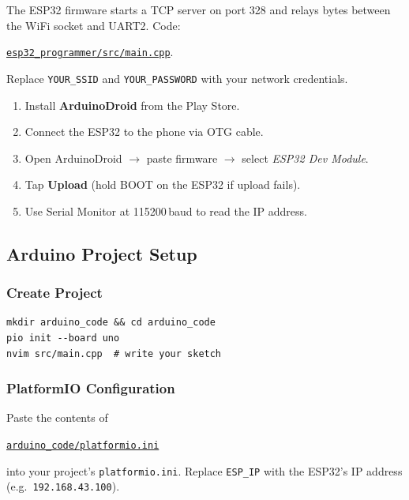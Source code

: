 \documentclass[11pt, a4paper]{article}
\begin{document}
The ESP32 firmware starts a TCP server on port 328 and relays bytes between the
WiFi socket and UART2. Code:
\begin{notebox}
\href{https://github.com/gajaredarsh/esp-flasher/blob/main/esp_programmer/src/main.cpp}%
{\texttt{esp32\_programmer/src/main.cpp}}.
\end{notebox}
Replace \texttt{YOUR\_SSID} and \texttt{YOUR\_PASSWORD} with your network credentials.

\begin{enumerate}
  \item Install \textbf{ArduinoDroid} from the Play Store.
  \item Connect the ESP32 to the phone via OTG cable.
  \item Open ArduinoDroid $\rightarrow$ paste firmware $\rightarrow$
        select \textit{ESP32 Dev Module}.
  \item Tap \textbf{Upload} (hold BOOT on the ESP32 if upload fails).
  \item Use Serial Monitor at 115200\,baud to read the IP address.
\end{enumerate}

\subsection{Arduino Project Setup}

\subsubsection{Create Project}

\begin{lstlisting}[caption={Initialize Arduino project}]
mkdir arduino_code && cd arduino_code
pio init --board uno
nvim src/main.cpp  # write your sketch
\end{lstlisting}

\subsubsection{PlatformIO Configuration}

Paste the contents of
\begin{notebox}
\href{https://github.com/gajaredarsh/esp-flasher/blob/main/arduino-code/platformio.ini}%
{\texttt{arduino\_code/platformio.ini}}
\end{notebox}
into your project's \texttt{platformio.ini}.
Replace \texttt{ESP\_IP} with the ESP32's IP address (e.g.\ \texttt{192.168.43.100}).
\end{document}
